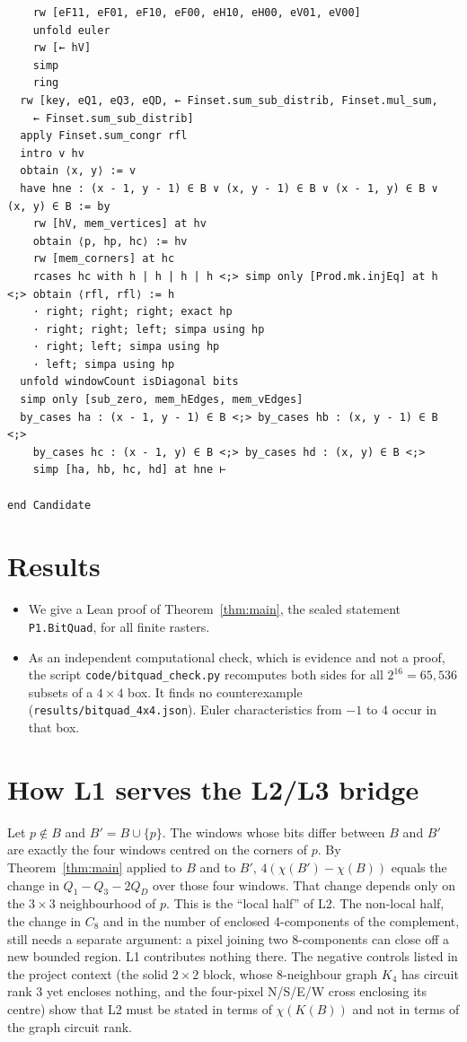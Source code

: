 \documentclass[11pt]{article}
\theoremstyle{definition}
\theoremstyle{remark}
\begin{document}
\begin{lstlisting}
    rw [eF11, eF01, eF10, eF00, eH10, eH00, eV01, eV00]
    unfold euler
    rw [← hV]
    simp
    ring
  rw [key, eQ1, eQ3, eQD, ← Finset.sum_sub_distrib, Finset.mul_sum,
    ← Finset.sum_sub_distrib]
  apply Finset.sum_congr rfl
  intro v hv
  obtain ⟨x, y⟩ := v
  have hne : (x - 1, y - 1) ∈ B ∨ (x, y - 1) ∈ B ∨ (x - 1, y) ∈ B ∨ (x, y) ∈ B := by
    rw [hV, mem_vertices] at hv
    obtain ⟨p, hp, hc⟩ := hv
    rw [mem_corners] at hc
    rcases hc with h | h | h | h <;> simp only [Prod.mk.injEq] at h <;> obtain ⟨rfl, rfl⟩ := h
    · right; right; right; exact hp
    · right; right; left; simpa using hp
    · right; left; simpa using hp
    · left; simpa using hp
  unfold windowCount isDiagonal bits
  simp only [sub_zero, mem_hEdges, mem_vEdges]
  by_cases ha : (x - 1, y - 1) ∈ B <;> by_cases hb : (x, y - 1) ∈ B <;>
    by_cases hc : (x - 1, y) ∈ B <;> by_cases hd : (x, y) ∈ B <;>
    simp [ha, hb, hc, hd] at hne ⊢

end Candidate
\end{lstlisting}

\section{Results}

\begin{itemize}
\item We give a Lean proof of Theorem~\ref{thm:main}, the sealed statement
  \texttt{P1.BitQuad}, for all finite rasters.
\item As an independent computational check, which is evidence and not a
  proof, the script \texttt{code/bitquad\_check.py} recomputes both sides for
  all $2^{16}=65{,}536$ subsets of a $4\times4$ box. It finds no
  counterexample (\texttt{results/bitquad\_4x4.json}). Euler characteristics
  from $-1$ to $4$ occur in that box.
\end{itemize}

\section{How L1 serves the L2/L3 bridge}

Let $p\notin B$ and $B'=B\cup\{p\}$. The windows whose bits differ between $B$
and $B'$ are exactly the four windows centred on the corners of $p$. By
Theorem~\ref{thm:main} applied to $B$ and to $B'$, $4(\chi(B')-\chi(B))$ equals
the change in $Q_1-Q_3-2Q_D$ over those four windows. That change depends only on the
$3\times3$ neighbourhood of $p$. This is the ``local half'' of L2. The non-local
half, the change in $C_8$ and in the number of enclosed 4-components of the
complement, still needs a separate argument: a pixel joining two
8-components can close off a new bounded region. L1 contributes nothing there.
The negative controls listed in the project context (the solid $2\times2$ block,
whose 8-neighbour graph $K_4$ has circuit rank 3 yet encloses nothing, and the
four-pixel N/S/E/W cross enclosing its centre) show that L2 must be stated
in terms of $\chi(K(B))$ and not in terms of the graph circuit rank.
\end{document}
